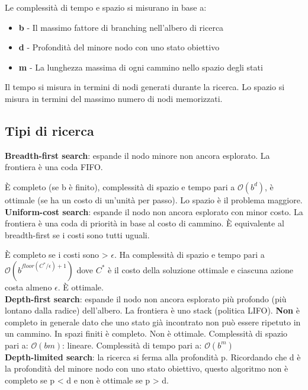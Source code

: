 Le complessità di tempo e spazio si misurano in base a:

\begin{itemize}
\item \textbf{b} - Il massimo fattore di branching nell'albero di ricerca
\item \textbf{d} - Profondità del minore nodo con uno stato obiettivo
\item \textbf{m} - La lunghezza massima di ogni cammino nello spazio degli stati
\end{itemize}

Il tempo si misura in termini di nodi generati durante la ricerca.
Lo spazio si misura in termini del massimo numero di nodi memorizzati.\\

\subsection{Tipi di ricerca}

\textbf{Breadth-first search}: espande il nodo minore non ancora esplorato.
La frontiera è una coda FIFO.

È completo (se b è finito), complessità di spazio e tempo pari a $\mathcal{O}(b^d)$,
è ottimale (se ha un costo di un'unità per passo).
Lo spazio è il problema maggiore.\\

\textbf{Uniform-cost search}: espande il nodo non ancora esplorato con minor costo.
La frontiera è una coda di priorità in base al costo di cammino.
È equivalente al breadth-first se i costi sono tutti uguali.

È completo se i costi sono > $\epsilon$. Ha complessità di spazio e tempo pari a
$\mathcal{O}(b^{floor(C^*/\epsilon)+1})$ dove $C^*$ è il costo della soluzione
ottimale e ciascuna azione costa almeno $\epsilon$. È ottimale.\\

\textbf{Depth-first search}: espande il nodo non ancora esplorato più profondo
(più lontano dalla radice) dell'albero. La frontiera è uno stack (politica LIFO).
\textbf{Non} è completo in generale dato che uno stato già incontrato non può
essere ripetuto in un cammino. In spazi finiti è completo. Non è ottimale.
Complessità di spazio pari a: $\mathcal{O}(bm)$: lineare.
Complessità di tempo pari a: $\mathcal{O}(b^m)$\\

\textbf{Depth-limited search}: la ricerca si ferma alla profondità p.
Ricordando che d è la profondità del minore nodo con uno stato obiettivo,
questo algoritmo non è completo se p < d e non è ottimale se p > d.\\

